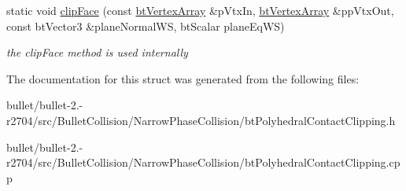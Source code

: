 \begin{DoxyCompactItemize}
\item 
\hypertarget{structbt_polyhedral_contact_clipping_a1ab4d8cdb0e9cce0dbba7843c29c0f0d}{static void \hyperlink{structbt_polyhedral_contact_clipping_a1ab4d8cdb0e9cce0dbba7843c29c0f0d}{clip\+Face} (const \hyperlink{classbt_aligned_object_array}{bt\+Vertex\+Array} \&p\+Vtx\+In, \hyperlink{classbt_aligned_object_array}{bt\+Vertex\+Array} \&pp\+Vtx\+Out, const bt\+Vector3 \&plane\+Normal\+W\+S, bt\+Scalar plane\+Eq\+W\+S)}\label{structbt_polyhedral_contact_clipping_a1ab4d8cdb0e9cce0dbba7843c29c0f0d}

\begin{DoxyCompactList}\small\item\em the clip\+Face method is used internally \end{DoxyCompactList}\end{DoxyCompactItemize}


The documentation for this struct was generated from the following files\+:\begin{DoxyCompactItemize}
\item 
bullet/bullet-\/2.-\/r2704/src/\+Bullet\+Collision/\+Narrow\+Phase\+Collision/bt\+Polyhedral\+Contact\+Clipping.\+h\item 
bullet/bullet-\/2.-\/r2704/src/\+Bullet\+Collision/\+Narrow\+Phase\+Collision/bt\+Polyhedral\+Contact\+Clipping.\+cpp\end{DoxyCompactItemize}
